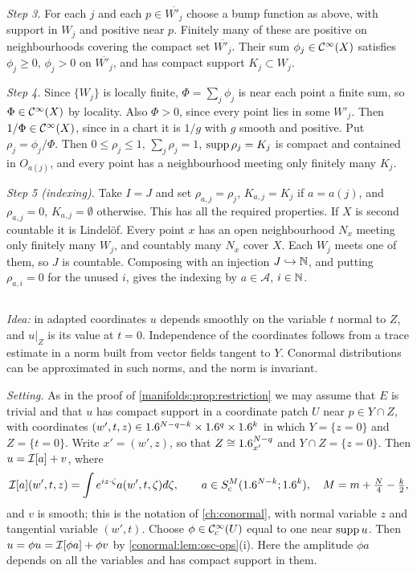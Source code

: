 \emph{Step 3.} For each $j$ and each $p\in\overline{W'_j}$ choose a bump function as above,
with support in $W_j$ and positive near $p$. Finitely many of these are positive on
neighbourhoods covering the compact set $\overline{W'_j}$. Their sum $\phi_j\in\mathcal{C}^\infty(X)$
satisfies $\phi_j\ge0$, $\phi_j>0$ on $\overline{W'_j}$, and has compact support
$K_j\subset W_j$.

\emph{Step 4.} Since $\{W_j\}$ is locally finite, $\Phi=\sum_j\phi_j$ is near each point a
finite sum, so $\Phi\in\mathcal{C}^\infty(X)$ by locality. Also $\Phi>0$, since every point lies in some
$W'_j$. Then $1/\Phi\in\mathcal{C}^\infty(X)$, since in a chart it is $1/g$ with $g$ smooth and positive.
Put $\rho_j=\phi_j/\Phi$. Then $0\le\rho_j\le1$, $\sum_j\rho_j=1$, $\operatorname{supp}\rho_j=K_j$ is compact
and contained in $O_{a(j)}$, and every point has a neighbourhood meeting only finitely
many $K_j$.

\emph{Step 5 (indexing).} Take $I=J$ and set $\rho_{a,j}=\rho_j$, $K_{a,j}=K_j$ if $a=a(j)$,
and $\rho_{a,j}=0$, $K_{a,j}=\emptyset$ otherwise. This has all the required properties.
If $X$ is second countable it is Lindel\"of. Every point $x$ has an open neighbourhood
$N_x$ meeting only finitely many $W_j$, and countably many $N_x$ cover $X$. Each $W_j$
meets one of them, so $J$ is countable. Composing with an injection $J\hookrightarrow\mathbb{N}$,
and putting $\rho_{a,i}=0$ for the unused $i$, gives the indexing by $a\in\mathcal A$,
$i\in\mathbb{N}$.

\subsection*{}
\emph{Idea:} in adapted coordinates $u$ depends smoothly on the variable $t$ normal to $Z$,
and $u|_Z$ is its value at $t=0$. Independence of the coordinates follows from a trace
estimate in a norm built from vector fields tangent to $Y$. Conormal distributions can
be approximated in such norms, and the norm is invariant.

\emph{Setting.} As in the proof of \cref{manifolds:prop:restriction} we may assume that
$E$ is trivial and that $u$ has compact support in a coordinate patch $U$ near
$p\in Y\cap Z$, with coordinates $(w',t,z)\in1.6^{N-q-k}\times1.6^q\times1.6^k$ in which
$Y=\{z=0\}$ and $Z=\{t=0\}$. Write $x'=(w',z)$, so that $Z\cong1.6^{N-q}_{x'}$ and $Y\cap Z=\{z=0\}$.
Then $u=\mathcal{I}[a]+v$, where
\begin{equation*}
\osc{a}(w',t,z)=\int e^{iz\cdot\zeta}a(w',t,\zeta)\,\dbar\zeta,\qquad a\in S^M_{\mathrm c}(\R^{N-k};\R^k),\quad M=m+\tfrac N4-\tfrac k2,
\end{equation*}
and $v$ is smooth; this is the notation of \cref{ch:conormal}, with normal variable $z$
and tangential variable $(w',t)$. Choose $\phi\in\mathcal{C}^\infty_{\mathrm{c}}(U)$ equal to one near $\operatorname{supp} u$.
Then $u=\phi u=\mathcal{I}[\phi a]+\phi v$ by \cref{conormal:lem:osc-ops}(i). Here the amplitude
$\phi a$ depends on all the variables and has compact support in them.

